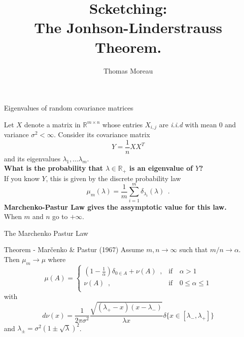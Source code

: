 \documentclass{beamer}
\institute{INRIA Saclay}
\author{Thomas Moreau}
\title{
    Scketching:\\
    The Jonhson-Linderstrauss Theorem.
}
\def\biblio{
    \nobibliography{../../library}
    \def\biblio{}
}
\begin{document}
    \begin{frame}
        \titlepage
    \end{frame}

    \begin{frame}{Eigenvalues of random covariance matrices}

        Let $X$ denote a matrix in $\mathbb R^{m \times n}$ whose entries $X_{i, j}$ are \emph{i.i.d} with mean $0$ and variance $\sigma^2 < \infty$.
        Consider its covariance matrix
        \[
            Y = \frac1n XX^T
        \] and its eigenvalues $\lambda_1, \dots \lambda_m$.\\[1em]

        \textbf{\centering What is the probability that $\lambda\in \mathbb R_+$ is an eigenvalue
        of $Y$?}\\[1em]

        If you know $Y$, this is given by the discrete probability law
        \[
            \mu_m(\lambda) = \frac1m\sum_{i=1}^m \delta_{\lambda_i}(\lambda)
            \enspace.
        \]
        \textbf{\centering Marchenko-Pastur Law gives the assymptotic value for this law.}\\
        When $m$ and $n$ go to $+\infty$.

    \end{frame}

    \begin{frame}{The Marchenko Pastur Law}

        \begin{block}{Theorem - \textcolor{linkcolor}{Marčenko \& Pastur (1967)}}
            Assume $m, n \to \infty$ such that $m / n \to \alpha$. Then $\mu_m \to \mu$ where\\
            \[
                \mu(A) = \begin{cases}
                    (1 - \frac1\alpha) \delta_{0 \in A} + \nu(A)\enspace,
                    & \text{if}\quad \alpha > 1\\
                    \nu(A)\enspace,
                    & \text{if}\quad 0 \le \alpha \le 1\\
                \end{cases}
            \]
            with
            \[
                d\nu(x) = \frac{1}{2\pi\sigma^2}
                \frac{\sqrt{(\lambda_+ - x)(x - \lambda_-)}}{\lambda x}
                \delta\{x \in [\lambda_-, \lambda_+]\}
            \]
            and $\lambda_\pm = \sigma^2(1 \pm \sqrt\lambda)^2$.
        \end{block}

    \end{frame}
\end{document}

